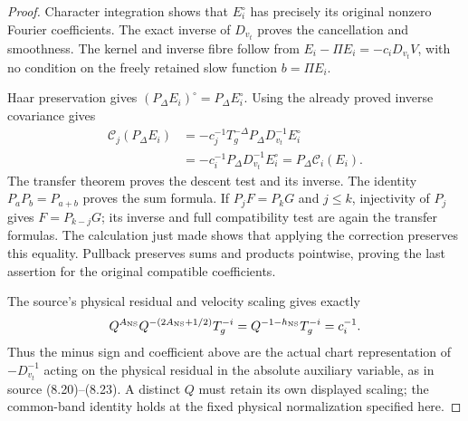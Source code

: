 \begin{proof}
Character integration shows that $E_i^\circ$ has precisely its
original nonzero Fourier coefficients. The exact inverse of
$D_{v_t}$ proves the cancellation and smoothness. The kernel
and inverse fibre follow from
$E_i-\Pi E_i=-c_iD_{v_t}V$, with no condition on the freely
retained slow function $b=\Pi E_i$.

Haar preservation gives $(P_\Delta E_i)^\circ=P_\Delta E_i^\circ$.
Using the already proved inverse covariance gives
\[
\begin{aligned}
 \mathcal C_j(P_\Delta E_i)
 &=-c_j^{-1}T_g^{-\Delta}P_\Delta D_{v_t}^{-1}E_i^\circ\\
 &=-c_i^{-1}P_\Delta D_{v_t}^{-1}E_i^\circ
 =P_\Delta\mathcal C_i(E_i).
\end{aligned}
\]
The transfer theorem proves the descent test and its inverse.
The identity $P_aP_b=P_{a+b}$ proves the sum formula. If
$P_jF=P_kG$ and $j\le k$, injectivity of $P_j$ gives
$F=P_{k-j}G$; its inverse and full compatibility test are
again the transfer formulas. The calculation just made shows
that applying the correction preserves this equality.
Pullback preserves sums and products pointwise, proving the
last assertion for the original compatible coefficients.

The source's physical residual and velocity scaling gives
exactly
\[
 Q^{A_{\rm NS}}Q^{-(2A_{\rm NS}+1/2)}T_g^{-i}
 =Q^{-1-h_{\rm NS}}T_g^{-i}=c_i^{-1}.
\]
Thus the minus sign and coefficient above are the actual
chart representation of $-D_{v_t}^{-1}$ acting on the
physical residual in the absolute auxiliary variable, as
in source (8.20)--(8.23). A distinct $Q$ must retain its own
displayed scaling; the common-band identity holds at the
fixed physical normalization specified here.
\end{proof}

